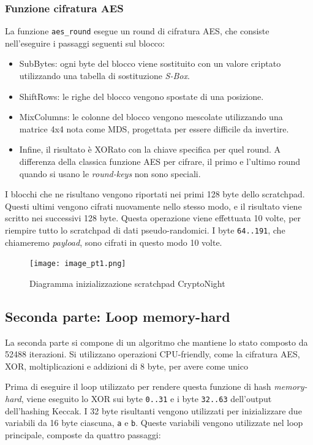 \subsubsection{Funzione cifratura AES}\label{funzione-cifratura-aes}

La funzione \texttt{aes\_round} esegue un round di cifratura AES, che
consiste nell'eseguire i passaggi seguenti sul blocco:

\begin{itemize}
\item
  SubBytes: ogni byte del blocco viene sostituito con un valore criptato
  utilizzando una tabella di sostituzione \emph{S-Box}.
\item
  ShiftRows: le righe del blocco vengono spostate di una posizione.
\item
  MixColumns: le colonne del blocco vengono mescolate utilizzando una
  matrice 4x4 nota come MDS, progettata per essere difficile
  da invertire.
\item
  Infine, il risultato è XORato con la chiave specifica per quel round.
  A differenza della classica funzione AES per cifrare, il primo e
  l'ultimo round quando si usano le \emph{round-keys} non sono speciali.
\end{itemize}

I blocchi che ne risultano vengono riportati nei primi 128 byte dello
scratchpad. Questi ultimi vengono cifrati nuovamente nello stesso modo,
e il risultato viene scritto nei successivi 128 byte. Questa operazione
viene effettuata 10 volte, per riempire tutto lo scratchpad di dati
pseudo-randomici. I byte \texttt{64..191}, che chiameremo
\emph{payload}, sono cifrati in questo modo 10 volte. 

\begin{figure}[h!]
  \centering
  \texttt{[image: image\_pt1.png]}
  \caption{Diagramma inizializzazione scratchpad CryptoNight}
  \label{fig:my_label}
\end{figure}

\subsection{Seconda parte: Loop
memory-hard}\label{seconda-parte-loop-memory-hard}

La seconda parte si compone di un algoritmo che mantiene lo stato
composto da 52488 iterazioni. Si utilizzano operazioni
CPU-friendly, come la cifratura AES, XOR, moltiplicazioni e addizioni di
8 byte, per avere come unico

Prima di eseguire il loop utilizzato per rendere questa funzione di hash
\emph{memory-hard}, viene eseguito lo XOR sui byte \texttt{0..31} e i
byte \texttt{32..63} dell'output dell'hashing Keccak. I 32 byte
risultanti vengono utilizzati per inizializzare due variabili da 16 byte
ciascuna, \texttt{a} e \texttt{b}. Queste variabili vengono utilizzate
nel loop principale, composte da quattro passaggi:

